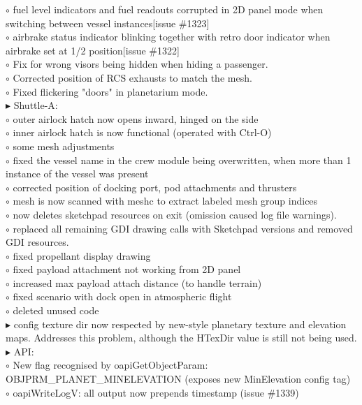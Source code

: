 \documentclass[Orbiter User Manual.tex]{subfiles}
\begin{document}
$\circ$ fuel level indicators and fuel readouts corrupted in 2D panel mode when switching between vessel instances[issue \#1323]\\
$\circ$ airbrake status indicator blinking together with retro door indicator when airbrake set at 1/2 position[issue \#1322]\\
$\circ$ Fix for wrong visors being hidden when hiding a passenger.\\
$\circ$ Corrected position of RCS exhausts to match the mesh.\\
$\circ$ Fixed flickering "doors" in planetarium mode.\\
$\blacktriangleright$ Shuttle-A:\\
$\circ$ outer airlock hatch now opens inward, hinged on the side\\
$\circ$ inner airlock hatch is now functional (operated with Ctrl-O)\\
$\circ$ some mesh adjustments\\
$\circ$ fixed the vessel name in the crew module being overwritten, when more than 1 instance of the vessel was present\\
$\circ$ corrected position of docking port, pod attachments and thrusters\\
$\circ$ mesh is now scanned with meshc to extract labeled mesh group indices\\
$\circ$ now deletes sketchpad resources on exit (omission caused log file warnings).\\
$\circ$ replaced all remaining GDI drawing calls with Sketchpad versions and removed GDI resources.\\
$\circ$ fixed propellant display drawing\\
$\circ$ fixed payload attachment not working from 2D panel\\
$\circ$ increased max payload attach distance (to handle terrain)\\
$\circ$ fixed scenario with dock open in atmospheric flight\\
$\circ$ deleted unused code\\
$\blacktriangleright$ config texture dir now respected by new-style planetary texture and elevation maps. Addresses this problem, although the HTexDir value is still not being used.\\
$\blacktriangleright$ API:\\
$\circ$ New flag recognised by oapiGetObjectParam: OBJPRM\_PLANET\_MINELEVATION (exposes new MinElevation config tag)\\
$\circ$ oapiWriteLogV: all output now prepends timestamp (issue \#1339)\\
\end{document}
